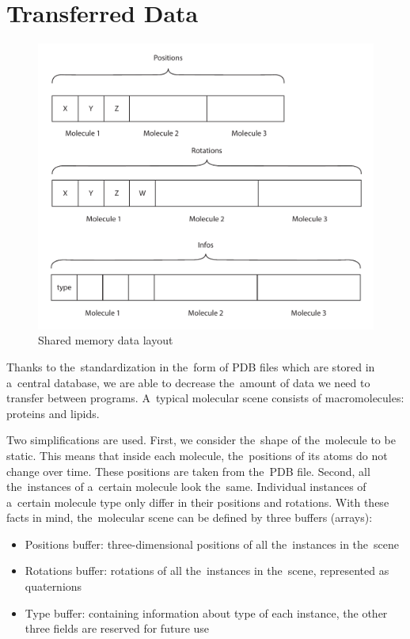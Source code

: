 \documentclass[
  digital, %
  table,   %
  nolof,     %
  nolot,     %
  oneside,
]{fithesis3}
\begin{document}
\section{Transferred Data}
\begin{figure}
  \centering
  \includegraphics[scale=0.5]{images/data-layout-all.pdf}
  \caption{Shared memory data layout}
  \label{fig:memory-layout}
\end{figure}

Thanks to the standardization in the form of PDB files which are stored in a central database, we are able to decrease the amount of data we need to transfer between programs. A typical molecular scene consists of macromolecules: proteins and lipids.

Two simplifications are used. First, we consider the shape of the molecule to be static. This means that inside each molecule, the positions of its atoms do not change over time. These positions are taken from the PDB file. Second, all the instances of a certain molecule look the same. Individual instances of a certain molecule type only differ in their positions and rotations. With these facts in mind, the molecular scene can be defined by three buffers (arrays):
\begin{itemize}
\item Positions buffer: three-dimensional positions of all the instances in the scene
\item Rotations buffer: rotations of all the instances in the scene, represented as quaternions
\item Type buffer: containing information about type of each instance, the other three fields are reserved for future use
\end{itemize}
\end{document}
